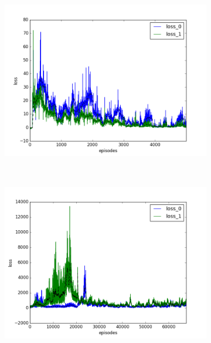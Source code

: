 \begin{figure}[t]
  \vspace{\graphspacing}
  \begin{subfigure}[t]{\figscale\linewidth}
    \hspace*{-2.75cm}
    \includegraphics[width=1.5\textwidth]
    {../results/dqn_1vs1/loss.png}
    \label{fig:dqn-1vs1-loss}
  \end{subfigure}
  ~
  \begin{subfigure}[t]{\figscale\linewidth}
    \hspace*{-1.4cm}
    \includegraphics[width=1.5\textwidth]
    {../results/ddpg_1vs1/loss.png}
    \label{fig:ddpg-1vs1-loss}
  \end{subfigure}
  ~
  \begin{subfigure}[t]{\figscale\linewidth}

\end{subfigure}
\end{figure}
